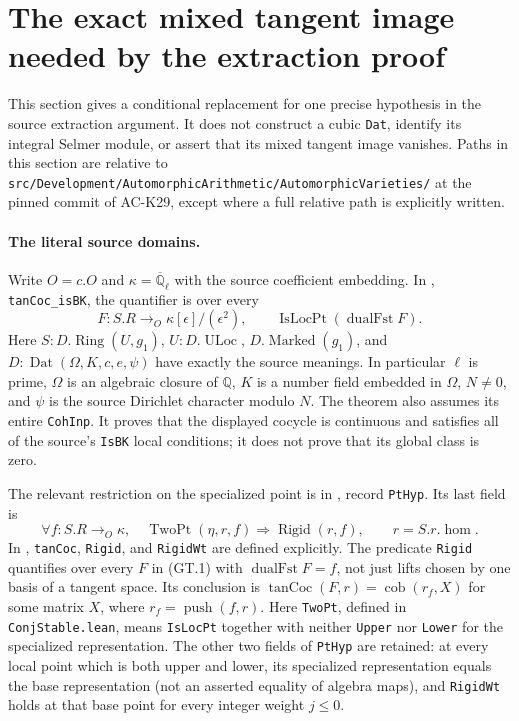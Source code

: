 \section{The exact mixed tangent image needed by the extraction proof}
\label{sec:cubic-tangent-image}

This section gives a conditional replacement for one precise hypothesis
in the source extraction argument.  It does not construct a cubic
\texttt{Dat}, identify its integral Selmer module, or assert that its
mixed tangent image vanishes.  Paths in this section are relative to
\texttt{src/Development/AutomorphicArithmetic/AutomorphicVarieties/}
at the pinned commit of AC-K29, except where a full relative path is
explicitly written.

\paragraph{The literal source domains.}
Write $O=c.O$ and $\kappa=\overline{\mathbb Q}_\ell$ with the
source coefficient embedding.  In
,
\texttt{tanCoc\_isBK}, the quantifier is over every
\[
 F:S.R\longrightarrow_O\kappa[\epsilon]/(\epsilon^2),
 \qquad \operatorname{IsLocPt}(\operatorname{dualFst}F).
                                                               \tag{GT.1}
\]
Here $S:D.\operatorname{Ring}(U,g_1)$, $U:D.\operatorname{ULoc}$,
$D.\operatorname{Marked}(g_1)$, and $D:\operatorname{Dat}
(\Omega,K,c,e,\psi)$ have exactly the source meanings.
In particular $\ell$ is prime, $\Omega$ is an algebraic closure
of $\mathbb Q$, $K$ is a number field embedded in $\Omega$,
$N\ne0$, and $\psi$ is the source Dirichlet character modulo $N$.
The theorem also assumes its entire \texttt{CohInp}.
It proves that the displayed cocycle is continuous and satisfies
all of the source's \texttt{IsBK} local conditions; it does not
prove that its global class is zero.

The relevant restriction on the specialized point is in
, record \texttt{PtHyp}.
Its last field is
\[
 \forall f:S.R\longrightarrow_O\kappa,\quad
 \operatorname{TwoPt}(\eta,r,f)\Longrightarrow
 \operatorname{Rigid}(r,f),\qquad r=S.r.\operatorname{hom}.
                                                               \tag{GT.2}
\]
In ,
\texttt{tanCoc}, \texttt{Rigid}, and \texttt{RigidWt} are defined explicitly.
The predicate \texttt{Rigid} quantifies over every $F$ in (GT.1)
with $\operatorname{dualFst}F=f$, not just lifts chosen by one
basis of a tangent space.  Its conclusion is
$\operatorname{tanCoc}(F,r)=\operatorname{cob}(r_f,X)$ for
some matrix $X$, where $r_f=\operatorname{push}(f,r)$.
Here \texttt{TwoPt}, defined in \texttt{ConjStable.lean}, means
\texttt{IsLocPt} together with neither \texttt{Upper} nor
\texttt{Lower} for the specialized representation.
The other two fields of \texttt{PtHyp} are retained: at every local
point which is both upper and lower, its specialized representation
equals the base representation (not an asserted equality of algebra
maps), and
\texttt{RigidWt} holds at that base point for every integer
weight $j\le0$.

